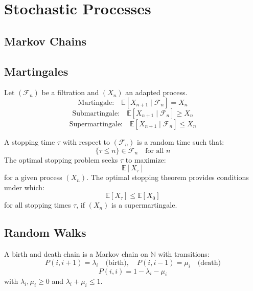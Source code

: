 \documentclass{article}
\begin{document}
\newpage
\section{Stochastic Processes}

\subsection{Markov Chains}


\subsection{Martingales}
\begin{tcolorbox}[colback=white,colframe=black,title={Martingales, Submartingales, Supermartingales}]
Let $(\mathcal{F}_n)$ be a filtration and $(X_n)$ an adapted process.
\[
\text{Martingale:} \quad \mathbb{E}[X_{n+1} \mid \mathcal{F}_n] = X_n
\]
\[
\text{Submartingale:} \quad \mathbb{E}[X_{n+1} \mid \mathcal{F}_n] \geq X_n
\]
\[
\text{Supermartingale:} \quad \mathbb{E}[X_{n+1} \mid \mathcal{F}_n] \leq X_n
\]
\end{tcolorbox}

\begin{tcolorbox}[colback=white,colframe=black,title={Optimal Stopping Times}]
A stopping time $\tau$ with respect to $(\mathcal{F}_n)$ is a random time such that:
\[
\{\tau \leq n\} \in \mathcal{F}_n \quad \text{for all } n
\]
The optimal stopping problem seeks $\tau$ to maximize:
\[
\mathbb{E}[X_\tau]
\]
for a given process $(X_n)$. The optimal stopping theorem provides conditions under which:
\[
\mathbb{E}[X_\tau] \leq \mathbb{E}[X_0]
\]
for all stopping times $\tau$, if $(X_n)$ is a supermartingale.
\end{tcolorbox}


\subsection{Random Walks}

\begin{tcolorbox}[colback=white,colframe=black,title={Birth and Death Chains}]
A birth and death chain is a Markov chain on $\mathbb{N}$ with transitions:
\[
P(i, i+1) = \lambda_i \quad \text{(birth)}, \quad P(i, i-1) = \mu_i \quad \text{(death)}
\]
\[
P(i, i) = 1 - \lambda_i - \mu_i
\]
with $\lambda_i, \mu_i \geq 0$ and $\lambda_i + \mu_i \leq 1$. 
\end{tcolorbox}
\end{document}
